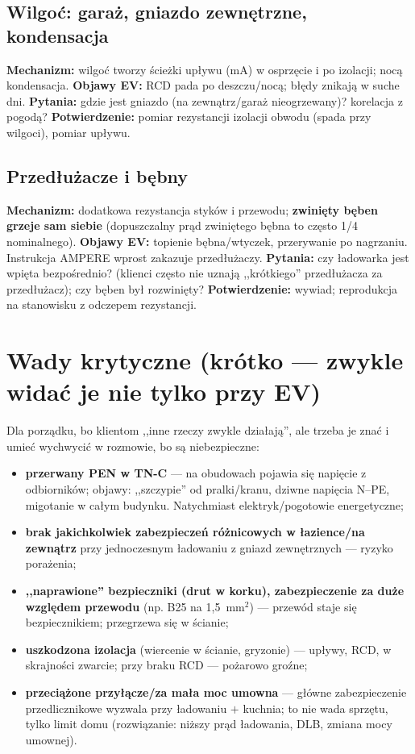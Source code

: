 \documentclass[11pt,a4paper]{article}
\begin{document}
\subsection{Wilgoć: garaż, gniazdo zewnętrzne, kondensacja}
\textbf{Mechanizm:} wilgoć tworzy ścieżki upływu (mA) w osprzęcie i po izolacji; nocą kondensacja.
\textbf{Objawy EV:} RCD pada po deszczu/nocą; błędy znikają w suche dni. \textbf{Pytania:} gdzie
jest gniazdo (na zewnątrz/garaż nieogrzewany)? korelacja z pogodą? \textbf{Potwierdzenie:} pomiar
rezystancji izolacji obwodu (spada przy wilgoci), pomiar upływu.

\subsection{Przedłużacze i bębny}
\textbf{Mechanizm:} dodatkowa rezystancja styków i przewodu; \textbf{zwinięty bęben grzeje sam
siebie} (dopuszczalny prąd zwiniętego bębna to często 1/4 nominalnego). \textbf{Objawy EV:}
topienie bębna/wtyczek, przerywanie po nagrzaniu. Instrukcja AMPERE wprost zakazuje przedłużaczy.
\textbf{Pytania:} czy ładowarka jest wpięta bezpośrednio? (klienci często nie uznają ,,krótkiego''
przedłużacza za przedłużacz); czy bęben był rozwinięty? \textbf{Potwierdzenie:} wywiad;
reprodukcja na stanowisku z odczepem rezystancji.

\section{Wady krytyczne (krótko --- zwykle widać je nie tylko przy EV)}
\label{sec:krytyczne}
Dla porządku, bo klientom ,,inne rzeczy zwykle działają'', ale trzeba je znać i umieć wychwycić
w rozmowie, bo są niebezpieczne:
\begin{itemize}
\item \textbf{przerwany PEN w TN-C} --- na obudowach pojawia się napięcie z odbiorników; objawy:
,,szczypie'' od pralki/kranu, dziwne napięcia N--PE, migotanie w całym budynku. Natychmiast
elektryk/pogotowie energetyczne;
\item \textbf{brak jakichkolwiek zabezpieczeń różnicowych w łazience/na zewnątrz} przy jednoczesnym
ładowaniu z gniazd zewnętrznych --- ryzyko porażenia;
\item \textbf{,,naprawione'' bezpieczniki (drut w korku), zabezpieczenie za duże względem przewodu}
(np. B25 na 1,5~mm$^2$) --- przewód staje się bezpiecznikiem; przegrzewa się w ścianie;
\item \textbf{uszkodzona izolacja} (wiercenie w ścianie, gryzonie) --- upływy, RCD, w skrajności
zwarcie; przy braku RCD --- pożarowo groźne;
\item \textbf{przeciążone przyłącze/za mała moc umowna} --- główne zabezpieczenie przedlicznikowe
wyzwala przy ładowaniu $+$ kuchnia; to nie wada sprzętu, tylko limit domu (rozwiązanie: niższy
prąd ładowania, DLB, zmiana mocy umownej).
\end{itemize}
\end{document}

